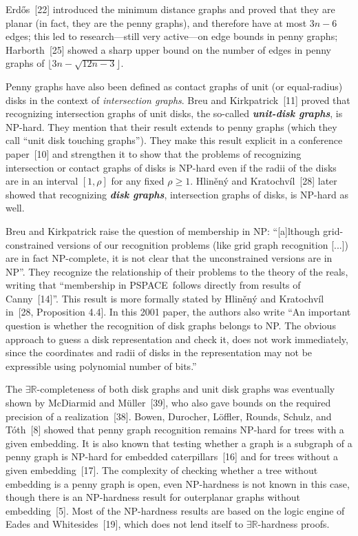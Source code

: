 \documentclass{article}
\newcommand{\defn}[1]{\textit{\textbf{\boldmath #1}}}
\begin{document}
Erdős~[22] introduced the minimum distance graphs 
and proved that they are planar (in fact, they are the penny graphs), and therefore have at most $3n-6$ edges; this led to research---still very active---on edge bounds in penny graphs; Harborth~[25] showed a sharp upper bound on the number of edges in penny graphs of $\lfloor 3n-\sqrt{12n-3}\rfloor$. 

Penny graphs have also been defined as 
contact graphs of unit (or equal-radius) disks in the context of {\em intersection graphs}. Breu and Kirkpatrick~[11] proved that recognizing intersection graphs of unit disks, the so-called \defn{unit-disk graphs}, is \textsf{NP}-hard.  They mention that their result extends to penny graphs (which they call ``unit disk touching graphs''). 
They make this result explicit in a conference paper~[10] and strengthen it to show that the problems of recognizing intersection or contact graphs of disks is \textsf{NP}-hard even if the radii of the disks are in an interval $[1,\rho]$ for any fixed $\rho \ge 1$.
Hliněný and Kratochvíl~[28] later showed that recognizing \defn{disk graphs}, intersection graphs of disks, is \textsf{NP}-hard as well.

Breu and Kirkpatrick raise the question of membership in \textsf{NP}: ``[a]lthough grid-constrained versions of our recognition problems
(like grid graph recognition [...]) are in fact \textsf{NP}-complete, it is
not clear that the unconstrained versions are in \textsf{NP}''. 
They recognize the relationship of their problems to the theory of the reals, writing that ``membership in \textsf{PSPACE}\ follows directly from results of Canny~[14]''. This result is more formally stated by Hliněný and Kratochvíl in~[28, Proposition 4.4]. In this 2001 paper, the authors also write ``An important question is whether the recognition of disk graphs belongs to \textsf{NP}. The
obvious approach to guess a disk representation and check it, does not work immediately,
since the coordinates and radii of disks in the representation may not be expressible
using polynomial number of bits.''

The \ensuremath{\exists\mathbb{R}}-completeness of both disk graphs and unit disk graphs was eventually shown by McDiarmid and Müller~[39], who also gave bounds on the required precision of a realization~[38]. 
Bowen, Durocher, Löffler, Rounds, Schulz, and Tóth~[8] showed that penny graph recognition remains \textsf{NP}-hard for trees with a given embedding. It is also known that testing whether a graph is a subgraph of a penny graph is \textsf{NP}-hard for embedded caterpillars~[16] and for trees without a given embedding~[17]. The complexity of checking whether a tree without embedding is a penny graph is open, even \textsf{NP}-hardness is not known in this case, though there is an \textsf{NP}-hardness result for outerplanar graphs without embedding~[5].
Most of the \textsf{NP}-hardness results are based on  
the logic engine of 
Eades and Whitesides~[19],
which does not lend itself to \ensuremath{\exists\mathbb{R}}-hardness proofs.
\end{document}
